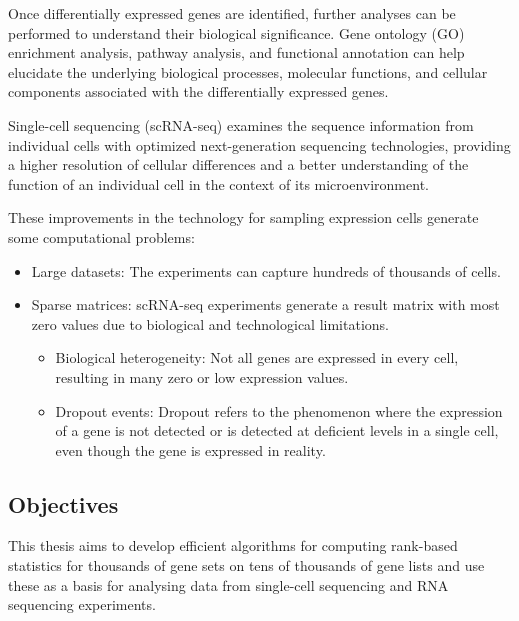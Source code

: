 \documentclass[aps,prb,twocolumn,superscriptaddress,floatfix,longbibliography]{revtex4-2}
\newif\ifptitle
\newif\ifpnumber
\newcounter{para}
\newcommand\ptitle[1]{\par\refstepcounter{para}
{\ifpnumber{\noindent\textcolor{lightgray}{\textbf{\thepara}}\indent}\fi}
{\ifptitle{\textbf{[{#1}]}}\fi}}
\begin{document}
Once differentially expressed genes are identified, further analyses can be performed to understand their biological significance. Gene ontology (GO) enrichment analysis, pathway analysis, and functional annotation can help elucidate the underlying biological processes, molecular functions, and cellular components associated with the differentially expressed genes.


\vspace{2mm}


\ptitle{Single-cell sequencing} \cite{triumphs-and-limitations-scRNA} Single-cell sequencing (scRNA-seq) examines the sequence information from individual cells with optimized next-generation sequencing technologies, providing a higher resolution of cellular differences and a better understanding of the function of an individual cell in the context of its microenvironment.

These improvements in the technology for sampling expression cells generate some computational problems:
\begin{itemize}
 \item Large datasets: The experiments can capture hundreds of thousands of cells.
 \item Sparse matrices: scRNA-seq experiments generate a result matrix with most zero values due to biological and technological limitations.
 \begin{itemize}
    \item Biological heterogeneity: Not all genes are expressed in every cell, resulting in many zero or low expression values.
    \item Dropout events: Dropout refers to the phenomenon where the expression of a gene is not detected or is detected at deficient levels in a single cell, even though the gene is expressed in reality.
 \end{itemize}

\end{itemize}

\subsection{Objectives} This thesis aims to develop efficient algorithms for computing rank-based statistics for thousands of gene sets on tens of thousands of gene lists and use these as a basis for analysing data from single-cell sequencing and RNA sequencing experiments.
\end{document}

